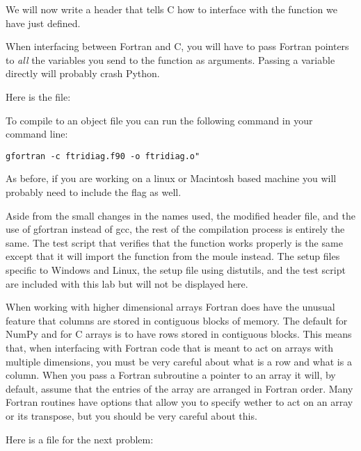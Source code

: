 We will now write a header that tells C how to interface with the function we have just defined.
\begin{warn}
When interfacing between Fortran and C, you will have to pass Fortran pointers to \emph{all} the variables you send to the function as arguments.
Passing a variable directly will probably crash Python.
\end{warn}
Here is the file:


To compile  to an object file you can run the following command in your command line:
\begin{lstlisting}[style=ShellInput]
gfortran -c ftridiag.f90 -o ftridiag.o"
\end{lstlisting}
As before, if you are working on a linux or Macintosh based machine you will probably need to include the  flag as well.

Aside from the small changes in the names used, the modified header file, and the use of gfortran instead of gcc, the rest of the compilation process is entirely the same.
The test script that verifies that the function works properly is the same except that it will import the function from the moule  instead.
The setup files specific to Windows and Linux, the setup file using distutils, and the test script are included with this lab but will not be displayed here.

When working with higher dimensional arrays Fortran does have the unusual feature that columns are stored in contiguous blocks of memory.
The default for NumPy and for C arrays is to have rows stored in contiguous blocks.
This means that, when interfacing with Fortran code that is meant to act on arrays with multiple dimensions, you must be very careful about what is a row and what is a column.
When you pass a Fortran subroutine a pointer to an array it will, by default, assume that the entries of the array are arranged in Fortran order.
Many Fortran routines have options that allow you to specify wether to act on an array or its transpose, but you should be very careful about this.

Here is a file for the next problem:


